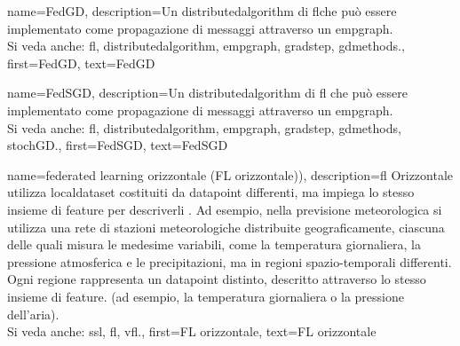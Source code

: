 {name={FedGD},
	description={Un \gls{distributedalgorithm} di \gls{fl}che può essere implementato come propagazione di messaggi attraverso un \gls{empgraph}. 
		\\ 
		Si veda anche: \gls{fl}, \gls{distributedalgorithm}, \gls{empgraph}, \gls{gradstep}, \gls{gdmethods}.},
	first={FedGD},
	text={FedGD}
} 

{name={FedSGD},
	description={Un \gls{distributedalgorithm} di \gls{fl} che può essere implementato come propagazione di messaggi attraverso un \gls{empgraph}. 
		\\ 
		Si veda anche: \gls{fl}, \gls{distributedalgorithm}, \gls{empgraph}, \gls{gradstep}, \gls{gdmethods}, \gls{stochGD}.},
	first={FedSGD},
	text={FedSGD}
} 

{name={federated learning orizzontale (FL orizzontale))},
description={\gls{fl} Orizzontale  utilizza \gls{localdataset} costituiti da
	   \gls{datapoint} differenti, ma impiega lo stesso insieme di \gls{feature} per descriverli \cite{HFLChapter2020}.
		Ad esempio, nella previsione meteorologica si utilizza una rete di stazioni meteorologiche distribuite geograficamente, 
		ciascuna delle quali misura le medesime variabili, come la temperatura giornaliera, la pressione atmosferica e le precipitazioni,
		ma in regioni spazio-temporali differenti. Ogni regione rappresenta un \gls{datapoint} distinto, descritto attraverso lo stesso insieme di \gls{feature}.
		(ad esempio, la temperatura giornaliera o la pressione dell'aria).
		\\
		Si veda anche: \gls{ssl}, \gls{fl}, \gls{vfl}.},
	first={FL orizzontale},
	text={FL orizzontale}
} 

